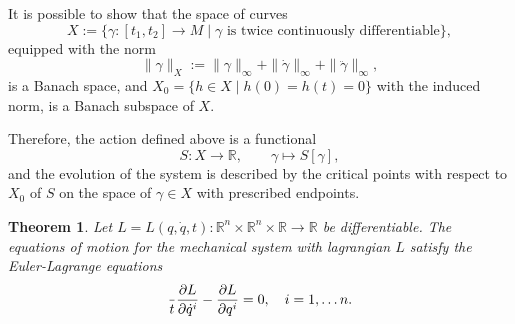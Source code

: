 \documentclass[english,fontsize=11pt,paper=a5,oneside]{scrbook}
\newcommand{\R}{\mathbb{R}}
\let\d\relax
\DeclareMathOperator{\d}{d}
\newtheorem{theorem}{Theorem}[chapter]
\theoremstyle{definition}
\begin{document}
It is possible to show that the space of curves 
\begin{equation}
    X := \big\{ \gamma: [t_1, t_2] \to M \mid \gamma \mbox{ is twice continuously differentiable}\big\},
\end{equation} equipped with the norm
\begin{equation}
    \|\gamma\|_X :=
    \|\gamma\|_\infty + \|\dot \gamma\|_\infty + \|\ddot \gamma\|_\infty,
\end{equation}
is a Banach space, and $X_0 = \big\{h\in X \mid h(0) = h(t) = 0\big\}$ with the induced norm, is a Banach subspace of $X$.

Therefore, the action defined above is a functional
\begin{equation}
    S : X \to \R,\qquad \gamma \mapsto S[\gamma],
\end{equation}
and the evolution of the system is described by the critical points with respect to $X_0$ of $S$ on the space of $\gamma \in X$ with prescribed endpoints.

\begin{theorem}
    Let $L = L(q, \dot q, t) : \R^{n}\times\R^{n}\times\R \to \R$ be differentiable.
    The equations of motion for the mechanical system with lagrangian $L$ satisfy the \emph{Euler-Lagrange equations}
    \begin{equation}\label{eq:eulerlagrange}
        \frac{\d}{\d t}\frac{\partial L}{\partial \dot q^i} - \frac{\partial L}{\partial q^i} = 0, \quad i=1,\ldots n.
    \end{equation}
\end{theorem}
\end{document}
